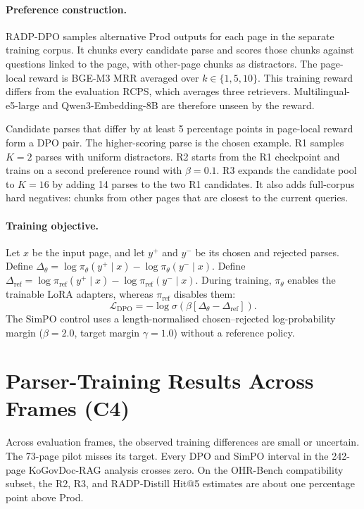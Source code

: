 \documentclass[11pt]{article}
\newcommand{\rcps}{\textnormal{\textsc{RCPS}}}
\newcommand{\contribTraining}{C4}
\begin{document}
\paragraph{Preference construction.} RADP-DPO samples alternative Prod outputs for each page in the separate training corpus. It chunks every candidate parse and scores those chunks against questions linked to the page, with other-page chunks as distractors. The page-local reward is BGE-M3 MRR averaged over $k\in\{1,5,10\}$. This training reward differs from the evaluation \rcps{}, which averages three retrievers. Multilingual-e5-large and Qwen3-Embedding-8B are therefore unseen by the reward.

Candidate parses that differ by at least 5 percentage points in page-local reward form a DPO pair. The higher-scoring parse is the chosen example. R1 samples $K=2$ parses with uniform distractors. R2 starts from the R1 checkpoint and trains on a second preference round with $\beta=0.1$. R3 expands the candidate pool to $K=16$ by adding 14 parses to the two R1 candidates. It also adds full-corpus hard negatives: chunks from other pages that are closest to the current queries.

\paragraph{Training objective.} Let $x$ be the input page, and let $y^+$ and $y^-$ be its chosen and rejected parses. Define $\Delta_\theta=\log\pi_\theta(y^+\mid x)-\log\pi_\theta(y^-\mid x)$. Define $\Delta_\text{ref}=\log\pi_\text{ref}(y^+\mid x)-\log\pi_\text{ref}(y^-\mid x)$. During training, $\pi_\theta$ enables the trainable LoRA adapters, whereas $\pi_\text{ref}$ disables them:
\begin{equation}
\mathcal{L}_\text{DPO} = -\log \sigma(\beta[\Delta_\theta - \Delta_\text{ref}]).
\end{equation}
The SimPO control uses a length-normalised chosen--rejected log-probability margin ($\beta=2.0$, target margin $\gamma=1.0$) without a reference policy.

\section{Parser-Training Results Across Frames (\contribTraining)}
\label{app:dpo}

Across evaluation frames, the observed training differences are small or uncertain. The 73-page pilot misses its target. Every DPO and SimPO interval in the 242-page KoGovDoc-RAG analysis crosses zero. On the OHR-Bench compatibility subset, the R2, R3, and RADP-Distill Hit@5 estimates are about one percentage point above Prod.
\end{document}
